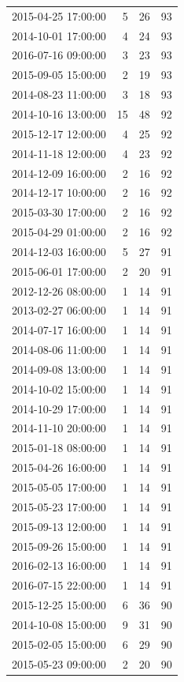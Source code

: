 \begin{tabular}{lrrr}
2015-04-25 17:00:00 & 5 & 26 & 93 \\
2014-10-01 17:00:00 & 4 & 24 & 93 \\
2016-07-16 09:00:00 & 3 & 23 & 93 \\
2015-09-05 15:00:00 & 2 & 19 & 93 \\
2014-08-23 11:00:00 & 3 & 18 & 93 \\
2014-10-16 13:00:00 & 15 & 48 & 92 \\
2015-12-17 12:00:00 & 4 & 25 & 92 \\
2014-11-18 12:00:00 & 4 & 23 & 92 \\
2014-12-09 16:00:00 & 2 & 16 & 92 \\
2014-12-17 10:00:00 & 2 & 16 & 92 \\
2015-03-30 17:00:00 & 2 & 16 & 92 \\
2015-04-29 01:00:00 & 2 & 16 & 92 \\
2014-12-03 16:00:00 & 5 & 27 & 91 \\
2015-06-01 17:00:00 & 2 & 20 & 91 \\
2012-12-26 08:00:00 & 1 & 14 & 91 \\
2013-02-27 06:00:00 & 1 & 14 & 91 \\
2014-07-17 16:00:00 & 1 & 14 & 91 \\
2014-08-06 11:00:00 & 1 & 14 & 91 \\
2014-09-08 13:00:00 & 1 & 14 & 91 \\
2014-10-02 15:00:00 & 1 & 14 & 91 \\
2014-10-29 17:00:00 & 1 & 14 & 91 \\
2014-11-10 20:00:00 & 1 & 14 & 91 \\
2015-01-18 08:00:00 & 1 & 14 & 91 \\
2015-04-26 16:00:00 & 1 & 14 & 91 \\
2015-05-05 17:00:00 & 1 & 14 & 91 \\
2015-05-23 17:00:00 & 1 & 14 & 91 \\
2015-09-13 12:00:00 & 1 & 14 & 91 \\
2015-09-26 15:00:00 & 1 & 14 & 91 \\
2016-02-13 16:00:00 & 1 & 14 & 91 \\
2016-07-15 22:00:00 & 1 & 14 & 91 \\
2015-12-25 15:00:00 & 6 & 36 & 90 \\
2014-10-08 15:00:00 & 9 & 31 & 90 \\
2015-02-05 15:00:00 & 6 & 29 & 90 \\
2015-05-23 09:00:00 & 2 & 20 & 90 \\

\end{tabular}
